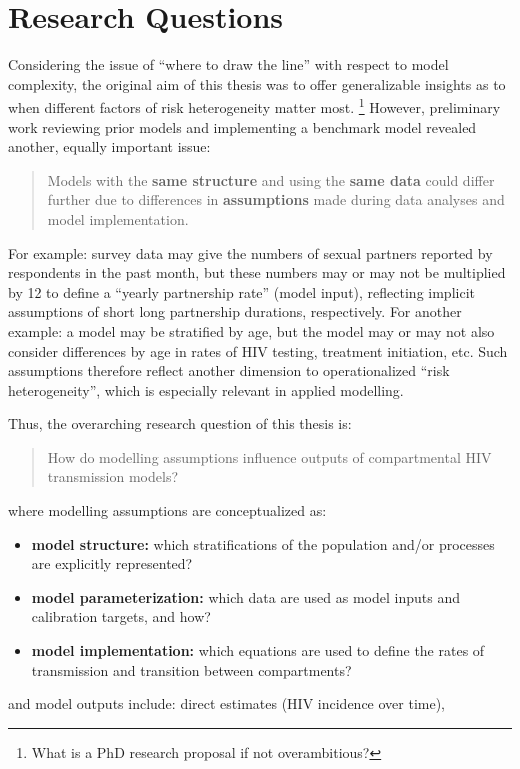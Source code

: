 \section{Research Questions}\label{intro.rqs}
Considering the issue of ``where to draw the line'' with respect to model complexity,
the original aim of this thesis was to offer generalizable insights as to
when different factors of risk heterogeneity matter most.%
\footnote{What is a PhD research proposal if not overambitious?}
However, preliminary work reviewing prior models and implementing a benchmark model
revealed another, equally important issue:
\begin{quote}
  Models with the \textbf{same structure} and using the \textbf{same data}
  could differ further due to differences in
  \textbf{assumptions} made during data analyses and model implementation.
\end{quote}
For example:
survey data may give the numbers of sexual partners reported by respondents in the past month,
but these numbers may or may not be multiplied by 12
to define a ``yearly partnership rate'' (model input),
reflecting implicit assumptions of short \vs long partnership durations, respectively.
For another example:
a model may be stratified by age, but the model may or may not also consider
differences by age in rates of HIV testing, treatment initiation, etc.
Such assumptions therefore reflect another dimension to operationalized ``risk heterogeneity'',
which is especially relevant in applied modelling.
\par
Thus, the overarching research question of this thesis is:
\begin{quote}
  How do modelling assumptions influence outputs of compartmental HIV transmission models?
\end{quote}
where modelling assumptions are conceptualized as:
\begin{itemize}
  \item \textbf{model structure:} which
  stratifications of the population and/or processes are explicitly represented?
  \item \textbf{model parameterization:} which
  data are used as model inputs and calibration targets, and how?
  \item \textbf{model implementation:} which
  equations are used to define the rates of transmission and transition between compartments?
\end{itemize}
and model outputs include:
direct estimates (\eg HIV incidence over time),
